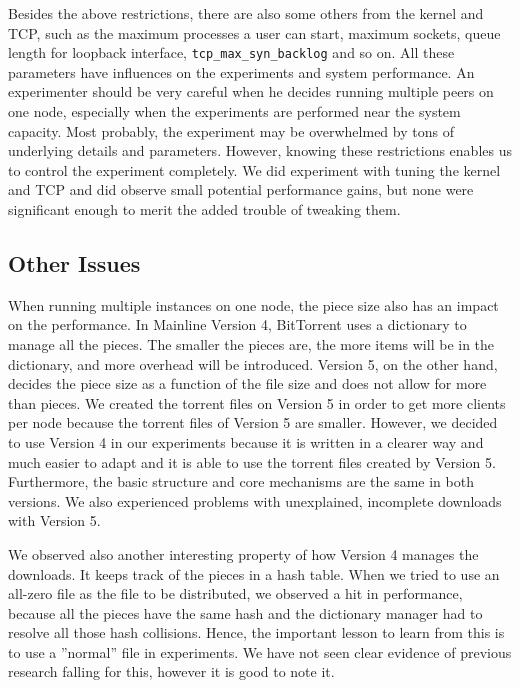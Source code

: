 \documentclass[10pt,letterpaper,twocolumn]{article}
\begin{document}
Besides the above restrictions, there are also some others from the
kernel and TCP, such as the maximum processes a user can start,
maximum sockets, queue length for loopback interface,
\texttt{tcp\_max\_syn\_backlog} and so on. All these parameters have influences
on the experiments and system performance. An experimenter should be
very careful when he decides running multiple peers on one node,
especially when the experiments are performed near the system
capacity. Most probably, the experiment may be overwhelmed by tons of
underlying details and parameters. However, knowing these restrictions
enables us to control the experiment completely. We did experiment
with tuning the kernel and TCP and did observe small potential
performance gains, but none were significant enough to merit the added
trouble of tweaking them.






\subsection{Other Issues}
\label{sec:other-issues}


When running multiple instances on one node, the piece size also has
an impact on the performance. In Mainline Version 4, BitTorrent uses a
dictionary to manage all the pieces. The smaller the pieces are, the
more items will be in the dictionary, and more overhead will be
introduced. Version 5, on the other hand, decides the piece size as a
function of the file size and does not allow for more than 
pieces. We created the torrent files on Version 5 in order to get more
clients per node because the torrent files of Version 5 are
smaller. However, we decided to use Version 4 in our experiments
because it is written in a clearer way and much easier to adapt and it
is able to use the torrent files created by Version 5. Furthermore,
the basic structure and core mechanisms are the same in both
versions. We also experienced problems with unexplained, incomplete
downloads with Version 5.















We observed also another interesting property of how Version 4 manages
the downloads. It keeps track of the pieces in a hash table. When we
tried to use an all-zero file as the file to be distributed, we
observed a hit in performance, because all the pieces have the same
hash and the dictionary manager had to resolve all those hash
collisions. Hence, the important lesson to learn from this is to use a
''normal'' file in experiments. We have not seen clear evidence of
previous research falling for this, however it is good to note it.
\end{document}
